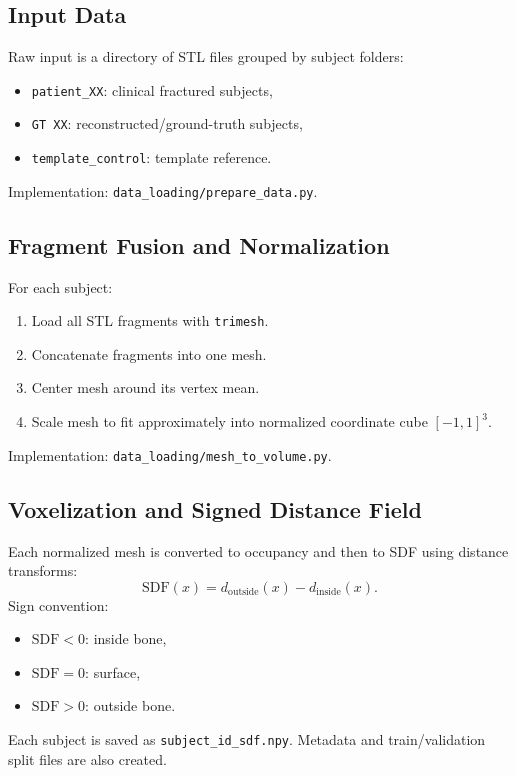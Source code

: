 ﻿\documentclass[11pt]{article}
\begin{document}
\subsection{Input Data}
Raw input is a directory of STL files grouped by subject folders:
\begin{itemize}[leftmargin=*]
    \item \texttt{patient\_XX}: clinical fractured subjects,
    \item \texttt{GT XX}: reconstructed/ground-truth subjects,
    \item \texttt{template\_control}: template reference.
\end{itemize}

Implementation: \texttt{data\_loading/prepare\_data.py}.

\subsection{Fragment Fusion and Normalization}
For each subject:
\begin{enumerate}[leftmargin=*]
    \item Load all STL fragments with \texttt{trimesh}.
    \item Concatenate fragments into one mesh.
    \item Center mesh around its vertex mean.
    \item Scale mesh to fit approximately into normalized coordinate cube $[-1,1]^3$.
\end{enumerate}

Implementation: \texttt{data\_loading/mesh\_to\_volume.py}.

\subsection{Voxelization and Signed Distance Field}
Each normalized mesh is converted to occupancy and then to SDF using distance transforms:
\begin{equation}
\mathrm{SDF}(x)=d_{\text{outside}}(x)-d_{\text{inside}}(x).
\end{equation}
Sign convention:
\begin{itemize}[leftmargin=*]
    \item $\mathrm{SDF}<0$: inside bone,
    \item $\mathrm{SDF}=0$: surface,
    \item $\mathrm{SDF}>0$: outside bone.
\end{itemize}
Each subject is saved as \texttt{subject\_id\_sdf.npy}. Metadata and train/validation split files are also created.
\end{document}
